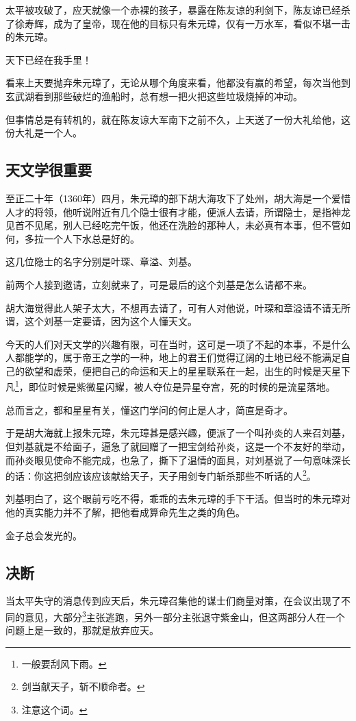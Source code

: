 \begin{multicols}{\theparacolNo}
		太平被攻破了，应天就像一个赤裸的孩子，暴露在陈友谅的利剑下，陈友谅已经杀了徐寿辉，成为了皇帝，现在他的目标只有朱元璋，仅有一万水军，看似不堪一击的朱元璋。

		天下已经在我手里！

		看来上天要抛弃朱元璋了，无论从哪个角度来看，他都没有赢的希望，每次当他到玄武湖看到那些破烂的渔船时，总有想一把火把这些垃圾烧掉的冲动。

		但事情总是有转机的，就在陈友谅大军南下之前不久，上天送了一份大礼给他，这份大礼是一个人。

		\subsection{天文学很重要}
		至正二十年（1360年）四月，朱元璋的部下胡大海攻下了处州，胡大海是一个爱惜人才的将领，他听说附近有几个隐士很有才能，便派人去请，所谓隐士，是指神龙见首不见尾，别人已经吃完午饭，他还在洗脸的那种人，未必真有本事，但不管如何，多拉一个人下水总是好的。

		这几位隐士的名字分别是叶琛、章溢、刘基。

		前两个人接到邀请，立刻就来了，可是最后的这个刘基是怎么请都不来。

		胡大海觉得此人架子太大，不想再去请了，可有人对他说，叶琛和章溢请不请无所谓，这个刘基一定要请，因为这个人懂天文。

		今天的人们对天文学的兴趣有限，可在当时，这可是一项了不起的本事，不是什么人都能学的，属于帝王之学的一种，地上的君王们觉得辽阔的土地已经不能满足自己的欲望和虚荣，便把自己的命运和天上的星星联系在一起，出生的时候是天星下凡\footnote{一般要刮风下雨。}，即位时候是紫微星闪耀，被人夺位是异星夺宫，死的时候的是流星落地。

		总而言之，都和星星有关，懂这门学问的何止是人才，简直是奇才。

		于是胡大海就上报朱元璋，朱元璋甚是感兴趣，便派了一个叫孙炎的人来召刘基，但刘基就是不给面子，逼急了就回赠了一把宝剑给孙炎，这是一个不友好的举动，而孙炎眼见使命不能完成，也急了，撕下了温情的面具，对刘基说了一句意味深长的话：你这把剑应该应该献给天子，天子用剑专门斩杀那些不听话的人\footnote{剑当献天子，斩不顺命者。}。

		刘基明白了，这个眼前亏吃不得，乖乖的去朱元璋的手下干活。但当时的朱元璋对他的真实能力并不了解，把他看成算命先生之类的角色。

		金子总会发光的。

		\subsection{决断}
		当太平失守的消息传到应天后，朱元璋召集他的谋士们商量对策，在会议出现了不同的意见，大部分\footnote{注意这个词。}主张逃跑，另外一部分主张退守紫金山，但这两部分人在一个问题上是一致的，那就是放弃应天。


\end{multicols}
